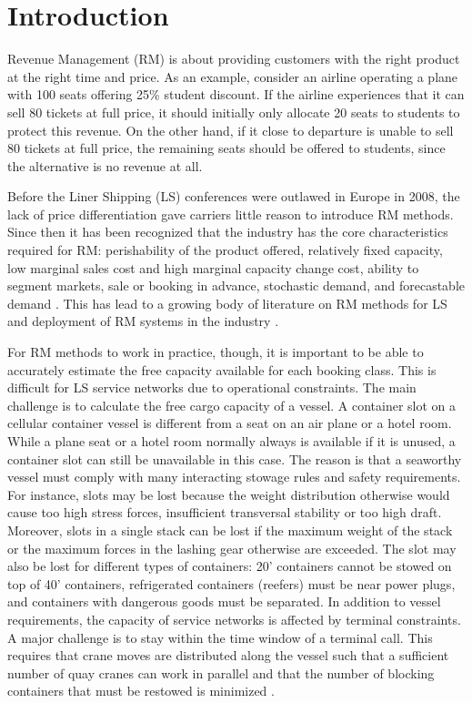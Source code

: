 \section{Introduction}

Revenue Management (RM) is about providing customers with the right product at the right time and price. As an example, consider an airline operating a plane with 100 seats offering 25\% student discount. If the airline experiences that it can sell 80 tickets at full price, it should initially only allocate 20 seats to students to protect this revenue. On the other hand, if it close to departure is unable to sell 80 tickets at full price, the remaining seats should be offered to students, since the alternative is no revenue at all.

Before the Liner Shipping (LS) conferences were outlawed in Europe in 2008, the lack of price differentiation gave carriers little reason to introduce RM methods. Since then it has been recognized that the industry has the core characteristics required for RM: perishability of the product offered, relatively fixed capacity, low marginal sales cost and high marginal capacity change cost, ability to segment markets, sale or booking in advance, stochastic demand, and forecastable demand \citep{Hellerman06}. This has lead to a growing body of literature on RM methods for LS  and deployment of RM systems in the industry \citep[e.g.,][]{Bingzhou08,Lu10,Zurheide15,Zhen17,Wang19a}.

For RM methods to work in practice, though, it is important to be able to accurately estimate the free capacity available for each booking class. This is difficult for LS service networks due to operational constraints. The main challenge is to calculate the free cargo capacity of a vessel. A container slot on a cellular container vessel is different from a seat on an air plane or a hotel room. While a plane seat or a hotel room normally always is available if it is unused, a container slot can still be unavailable in this case. The reason is that a seaworthy vessel must comply with many interacting stowage rules and safety requirements. For instance, slots may be lost because the weight distribution otherwise would cause too high stress forces, insufficient transversal stability or too high draft. Moreover, slots in a single stack can be lost if the maximum weight of the stack or the maximum forces in the lashing gear otherwise are exceeded. The slot may also be lost for different types of containers: 20' containers cannot be stowed on top of 40' containers, refrigerated containers (reefers) must be near power plugs, and containers with dangerous goods must be separated. In addition to vessel requirements, the capacity of service networks is affected by terminal constraints. A major challenge is to stay within the time window of a terminal call. This requires that crane moves are distributed along the vessel such that a sufficient number of quay cranes can work in parallel and that the number of blocking containers that must be restowed is minimized \citep{JPAV18}.

